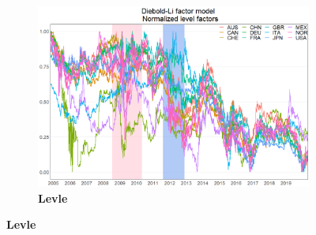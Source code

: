 \documentclass[12pt,bibliography=totoc]{article}
\begin{document}

\begin{figure}[H]
\centering
\caption{Normlized factor time series}
\begin{subfigure}{.5\linewidth}
\centering
\includegraphics[width=\linewidth]{Normalizedlevel}
\caption{\textbf{Levle}}


\end{subfigure}
\end{figure}
\end{document}
